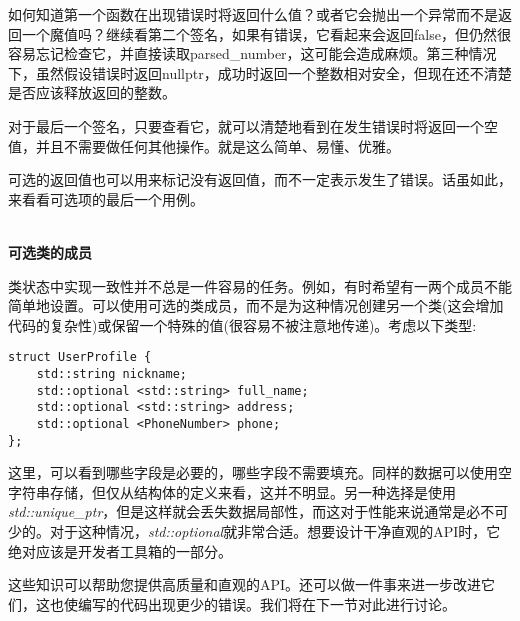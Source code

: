 如何知道第一个函数在出现错误时将返回什么值？或者它会抛出一个异常而不是返回一个魔值吗？继续看第二个签名，如果有错误，它看起来会返回false，但仍然很容易忘记检查它，并直接读取parsed\_number，这可能会造成麻烦。第三种情况下，虽然假设错误时返回nullptr，成功时返回一个整数相对安全，但现在还不清楚是否应该释放返回的整数。

对于最后一个签名，只要查看它，就可以清楚地看到在发生错误时将返回一个空值，并且不需要做任何其他操作。就是这么简单、易懂、优雅。

可选的返回值也可以用来标记没有返回值，而不一定表示发生了错误。话虽如此，来看看可选项的最后一个用例。

\hspace*{\fill} \\ %
\noindent
\textbf{可选类的成员}

类状态中实现一致性并不总是一件容易的任务。例如，有时希望有一两个成员不能简单地设置。可以使用可选的类成员，而不是为这种情况创建另一个类(这会增加代码的复杂性)或保留一个特殊的值(很容易不被注意地传递)。考虑以下类型:

\begin{lstlisting}[style=styleCXX]
struct UserProfile {
	std::string nickname;
	std::optional <std::string> full_name;
	std::optional <std::string> address;
	std::optional <PhoneNumber> phone;
};
\end{lstlisting}

这里，可以看到哪些字段是必要的，哪些字段不需要填充。同样的数据可以使用空字符串存储，但仅从结构体的定义来看，这并不明显。另一种选择是使用\textit{std::unique\_ptr}，但是这样就会丢失数据局部性，而这对于性能来说通常是必不可少的。对于这种情况，\textit{std::optional}就非常合适。想要设计干净直观的API时，它绝对应该是开发者工具箱的一部分。

这些知识可以帮助您提供高质量和直观的API。还可以做一件事来进一步改进它们，这也使编写的代码出现更少的错误。我们将在下一节对此进行讨论。










